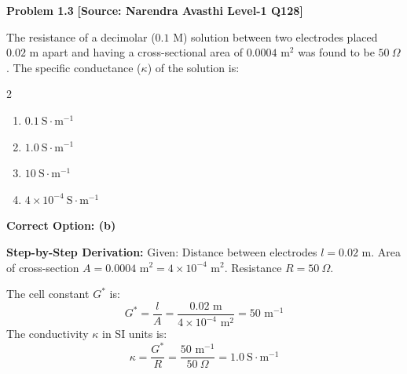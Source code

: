 \begin{problembox}
\textbf{Problem 1.3} \hfill \textbf{[Source: Narendra Avasthi Level-1 Q128]}

The resistance of a decimolar ($0.1\text{ M}$) solution between two electrodes placed $0.02\text{ m}$ apart and having a cross-sectional area of $0.0004\text{ m}^2$ was found to be $50\ \Omega$. The specific conductance ($\kappa$) of the solution is:
\begin{multicols}{2}
\begin{enumerate}[label=(\alph*)]
    \item $0.1\ \text{S}\cdot\text{m}^{-1}$
    \item $1.0\ \text{S}\cdot\text{m}^{-1}$
    \item $10\ \text{S}\cdot\text{m}^{-1}$
    \item $4 \times 10^{-4}\ \text{S}\cdot\text{m}^{-1}$
\end{enumerate}
\end{multicols}
\end{problembox}
\begin{solution}
\textbf{Correct Option: (b)}

\textbf{Step-by-Step Derivation:}
Given:
Distance between electrodes $l = 0.02\text{ m}$.
Area of cross-section $A = 0.0004\text{ m}^2 = 4 \times 10^{-4}\text{ m}^2$.
Resistance $R = 50\ \Omega$.

The cell constant $G^*$ is:
\begin{equation*}
    G^* = \frac{l}{A} = \frac{0.02\text{ m}}{4 \times 10^{-4}\text{ m}^2} = 50\text{ m}^{-1}
\end{equation*}
The conductivity $\kappa$ in SI units is:
\begin{equation*}
    \kappa = \frac{G^*}{R} = \frac{50\text{ m}^{-1}}{50\ \Omega} = 1.0\ \text{S}\cdot\text{m}^{-1}
\end{equation*}
\end{solution}


